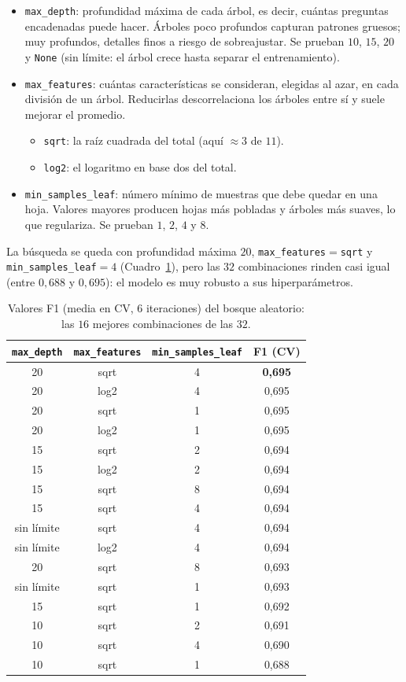 \documentclass[12pt,a4paper]{report}
\theoremstyle{definition}
\newcommand{\tc}[1]{\texttt{#1}}
\begin{document}
\begin{itemize}
\item \tc{max\_depth}: profundidad máxima de cada árbol, es decir, cuántas preguntas
encadenadas puede hacer. Árboles poco profundos capturan patrones gruesos; muy profundos,
detalles finos a riesgo de sobreajustar. Se prueban $10$, $15$, $20$ y \tc{None} (sin límite:
el árbol crece hasta separar el entrenamiento).
\item \tc{max\_features}: cuántas características se consideran, elegidas al azar, en cada
división de un árbol. Reducirlas descorrelaciona los árboles entre sí y suele mejorar el
promedio.
  \begin{itemize}
  \item \tc{sqrt}: la raíz cuadrada del total (aquí $\approx 3$ de $11$).
  \item \tc{log2}: el logaritmo en base dos del total.
  \end{itemize}
\item \tc{min\_samples\_leaf}: número mínimo de muestras que debe quedar en una hoja. Valores
mayores producen hojas más pobladas y árboles más suaves, lo que regulariza. Se prueban $1$,
$2$, $4$ y $8$.
\end{itemize}

La búsqueda se queda con profundidad máxima $20$, \tc{max\_features}${}=$\tc{sqrt} y \tc{min\_samples\_leaf}${}=4$ (Cuadro~\ref{tab:grid-rf}), pero las $32$ combinaciones rinden casi igual (entre $0{,}688$ y $0{,}695$): el modelo es muy robusto a sus hiperparámetros.

\begin{table}[H]
\centering\footnotesize
\begin{tabular}{cccc}
\toprule
\tc{max\_depth} & \tc{max\_features} & \tc{min\_samples\_leaf} & F1 (CV) \\
\midrule
20 & sqrt & 4 & \textbf{0,695} \\
20 & log2 & 4 & 0,695 \\
20 & sqrt & 1 & 0,695 \\
20 & log2 & 1 & 0,695 \\
15 & sqrt & 2 & 0,694 \\
15 & log2 & 2 & 0,694 \\
15 & sqrt & 8 & 0,694 \\
15 & sqrt & 4 & 0,694 \\
sin límite & sqrt & 4 & 0,694 \\
sin límite & log2 & 4 & 0,694 \\
20 & sqrt & 8 & 0,693 \\
sin límite & sqrt & 1 & 0,693 \\
15 & sqrt & 1 & 0,692 \\
10 & sqrt & 2 & 0,691 \\
10 & sqrt & 4 & 0,690 \\
10 & sqrt & 1 & 0,688 \\
\bottomrule
\end{tabular}
\caption{Valores F1 (media en CV, 6 iteraciones) del bosque aleatorio: las $16$ mejores
combinaciones de las $32$.}
\label{tab:grid-rf}
\end{table}
\end{document}
